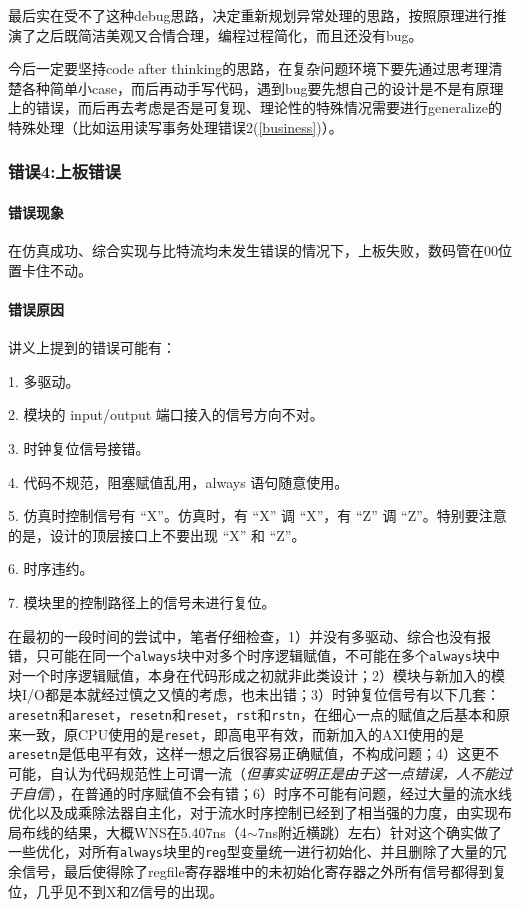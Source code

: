 \documentclass[UTF-8,twoside,c5size]{ctexart}
\begin{document}
	最后实在受不了这种debug思路，决定重新规划异常处理的思路，按照原理进行推演了之后既简洁美观又合情合理，编程过程简化，而且还没有bug。
	
	今后一定要坚持code after thinking的思路，在复杂问题环境下要先通过思考理清楚各种简单小case，而后再动手写代码，遇到bug要先想自己的设计是不是有原理上的错误，而后再去考虑是否是可复现、理论性的特殊情况需要进行generalize的特殊处理（比如运用读写事务处理错误2(\ref{business})）。
    	
   	\subsubsection{错误\textbf{4:}上板错误}
    	
    \paragraph{错误现象}\hfill
    
    在仿真成功、综合实现与比特流均未发生错误的情况下，上板失败，数码管在00位置卡住不动。
    
    \paragraph{错误原因}\hfill
    
    讲义上提到的错误可能有：
    
    1. 多驱动。
    
    2. 模块的 input/output 端口接入的信号方向不对。
    
    3. 时钟复位信号接错。
    
    4. 代码不规范，阻塞赋值乱用，always 语句随意使用。
    
    5. 仿真时控制信号有 “X”。仿真时，有 “X” 调 “X”，有 “Z” 调 “Z”。特别要注意的是，设计的顶层接口上不要出现 “X” 和 “Z”。
    
    6. 时序违约。
    
    7. 模块里的控制路径上的信号未进行复位。
    
    在最初的一段时间的尝试中，笔者仔细检查，1）并没有多驱动、综合也没有报错，只可能在同一个\texttt{always}块中对多个时序逻辑赋值，不可能在多个\texttt{always}块中对一个时序逻辑赋值，本身在代码形成之初就非此类设计；2）模块与新加入的模块I/O都是本就经过慎之又慎的考虑，也未出错；3）时钟复位信号有以下几套：\texttt{aresetn}和\texttt{areset}，\texttt{resetn}和\texttt{reset}，\texttt{rst}和\texttt{rstn}，在细心一点的赋值之后基本和原来一致，原CPU使用的是\texttt{reset}，即高电平有效，而新加入的AXI使用的是\texttt{aresetn}是低电平有效，这样一想之后很容易正确赋值，不构成问题；4）这更不可能，自认为代码规范性上可谓一流（\textsl{但事实证明正是由于这一点错误，人不能过于自信}），在普通的时序赋值不会有错；6）时序不可能有问题，经过大量的流水线优化以及成乘除法器自主化，对于流水时序控制已经到了相当强的力度，由实现布局布线的结果，大概WNS在5.407ns（4$\sim$7ns附近横跳）左右）针对这个确实做了一些优化，对所有\texttt{always}块里的\texttt{reg}型变量统一进行初始化、并且删除了大量的冗余信号，最后使得除了regfile寄存器堆中的未初始化寄存器之外所有信号都得到复位，几乎见不到X和Z信号的出现。
    
\end{document}
